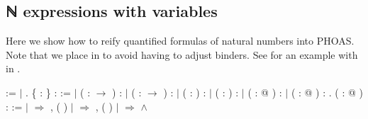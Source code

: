 \subsection{ℕ expressions with variables}

 Here we show how to reify quantified formulas of natural numbers
      into PHOAS.  Note that we place  in  to avoid having
      to adjust  binders.  See  for an example
      with  in . \begin{coqdoccode}
\coqdocemptyline
\coqdocindent{1.00em}
  :=  \ensuremath{|} .\coqdoceol
\coqdocemptyline
\coqdocindent{1.00em}
  \{ : \} :  :=\coqdoceol
\coqdocindent{1.00em}
\ensuremath{|}  ( :  \ensuremath{\rightarrow} ) : \coqdoceol
\coqdocindent{1.00em}
\ensuremath{|}  ( :  \ensuremath{\rightarrow} ) : \coqdoceol
\coqdocindent{1.00em}
\ensuremath{|}  (  : ) : \coqdoceol
\coqdocindent{1.00em}
\ensuremath{|}  (  : ) : \coqdoceol
\coqdocindent{1.00em}
\ensuremath{|}  (  : @ ) : \coqdoceol
\coqdocindent{1.00em}
\ensuremath{|}  (  : @ ) : .\coqdoceol
\coqdocemptyline
\coqdocindent{1.00em}
  ( : @ ) : \coqdoceol
\coqdocindent{2.00em}
:=   \coqdoceol
\coqdocindent{3.50em}
\ensuremath{|}   \ensuremath{\Rightarrow} \coqdockw{\ensuremath{\forall}} ,  ( )\coqdoceol
\coqdocindent{3.50em}
\ensuremath{|}   \ensuremath{\Rightarrow} \coqdoctac{\ensuremath{\exists}} ,  ( )\coqdoceol
\coqdocindent{3.50em}
\ensuremath{|}    \ensuremath{\Rightarrow}   \ensuremath{\land}  \coqdoceol

\end{coqdoccode}
